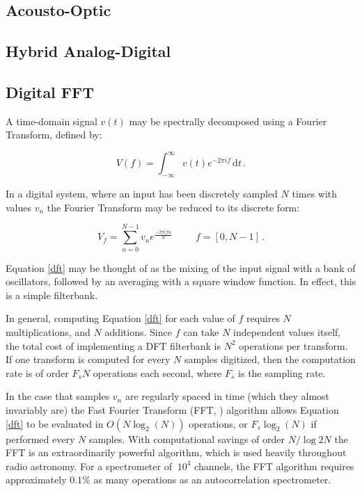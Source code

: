 \documentclass{ws-rv961x669}
\begin{document}
\subsection{Acousto-Optic}\label{acousto-optic}

\subsection{Hybrid Analog-Digital}\label{hybrid-analog-digital}

\subsection{Digital FFT}\label{digital-fft}
A time-domain signal $v(t)$ may be spectrally decomposed using a Fourier Transform, defined by:

\begin{equation}
 \label{ft}
 V(f) = \int_{-\infty}^{\infty} v(t) e^{-2\pi i f} \,\mathrm{d}t\, .
\end{equation}

In a digital system, where an input has been discretely sampled $N$ times with values $v_n$ the Fourier Transform may be reduced to its discrete form: 

\begin{equation}
 \label{dft}
 V_f = \sum_{n = 0}^{N-1} v_n e^{\frac{-2\pi i f n}{N}} \hspace{1cm} f = [0, N-1]\,.
\end{equation}

Equation \ref{dft} may be thought of as the mixing of the input signal with a bank of oscillators, followed by an averaging with a square window function. In effect, this is a simple filterbank.

In general, computing Equation \ref{dft} for each value of $f$ requires $N$ multiplications, and $N$ additions. Since $f$ can take $N$ independent values itself, the total cost of implementing a DFT filterbank is $N^2$ operations per transform. If one transform is computed for every $N$ samples digitized, then the computation rate is of order $F_sN$ operations each second, where $F_s$ is the sampling rate.

In the case that samples $v_n$ are regularly spaced in time (which they almost invariably are) the Fast Fourier Transform (FFT, \cite{Cooley1965}) algorithm allows Equation \ref{dft} to be evaluated in $O(N\log_2(N))$ operations, or $F_s\log_2(N)$ if performed every $N$ samples. With computational savings of order $N / \log2{N}$ the FFT is an extraordinarily powerful algorithm, which is used heavily throughout radio astronomy. For a spectrometer of $~10^4$ channels, the FFT algorithm requires approximately $0.1\%$ as many operations as an autocorrelation spectrometer.
\end{document}
